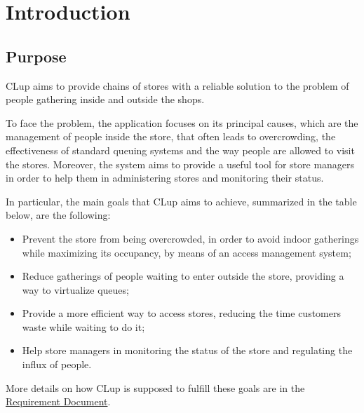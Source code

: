 \documentclass[a4paper,oneside,11pt]{book}
\begin{document}
\tableofcontents
\newpage
{}

\chapter{Introduction}
    \section{Purpose}
    CLup aims to provide chains of stores with a reliable solution to the problem of people gathering inside and outside the shops. \par
    To face the problem, the application focuses on its principal causes, which are the management of people inside the store, that often leads to overcrowding, the effectiveness of standard queuing systems and the way people are allowed to visit the stores. Moreover, the system aims to provide a useful tool for store managers in order to help them in administering stores and monitoring their status. \par
    In particular, the main goals that CLup aims to achieve, summarized in the table below, are the following:
    \begin{itemize}
        \item Prevent the store from being overcrowded, in order to avoid indoor gatherings while maximizing its occupancy, by means of an access management system;
        \item Reduce gatherings of people waiting to enter outside the store, providing a way to virtualize queues;
        \item Provide a more efficient way to access stores, reducing the time customers waste while waiting to do it;
        \item Help store managers in monitoring the status of the store and regulating the influx of people.
    \end{itemize}
    More details on how CLup is supposed to fulfill these goals are in the \href{run:../DeliveryFolder/RASD2.pdf}{Requirement Document}.
    
\end{document}
